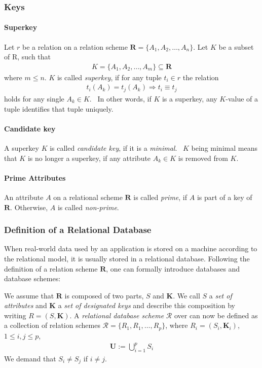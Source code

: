 \subsubsection{Keys}
\paragraph{Superkey}Let \( r \) be a relation on a relation scheme \( \boldsymbol{R} = \{ A_1, A_2, \dots, A_n \} \).
Let \( K \) be a subset of R, such that
\begin{align}
    K = \{ A_1, A_2, \dots, A_m \} \subseteq \boldsymbol{R}
\end{align}
where \( m \leq n \).
\( K \) is called \emph{superkey}, if for any tuple \( t_i \in r \) the relation
\begin{align*}
    t_i(A_k) = t_j(A_k) \Rightarrow t_i \equiv t_j
\end{align*}
holds for any single \( A_k \in K \).~\cite[p.~4]{MAI83}
In other words, if \( K \) is a superkey, any \( K \)-value of a tuple identifies that tuple uniquely.~\cite[p.~32]{SCH17}

\paragraph{Candidate key} A superkey \( K \) is called \emph{candidate key}, if it is a \emph{minimal}.~\cite[p.~32]{SCH17}
\( K \) being minimal means that \( K \) is no longer a superkey, if any attribute \( A_k \in K \) is removed from \( K \).

\paragraph{Prime Attributes} An attribute \( A \) on a relational scheme \( \boldsymbol{R} \) is called \emph{prime}, if \( A \) is part of a key of \( \boldsymbol{R} \).
Otherwise, \( A \) is called \emph{non-prime}.

\subsubsection{Definition of a Relational Database}
When real-world data used by an application is stored on a machine according to the relational model, it is usually stored in a relational database.
Following the definition of a relation scheme \( \boldsymbol{R} \), one can formally introduce databases and database schemes:

We assume that \( \boldsymbol{R}\) is composed of two parts, \(S\) and \(\boldsymbol{K}\). We call \(S\) a \emph{set of attributes} and \(\boldsymbol{K}\) a \emph{set of designated keys} and describe this composition by writing \(R = (S, \boldsymbol{K})\).
A \emph{relational database scheme} \( \mathcal{R} \) over  can now be defined as a collection of relation schemes \( \mathcal{R} = \{R_1, R_1, \dots, R_p\} \), where \(R_i = (S_i, \boldsymbol{K}_i)\), \(1 \leq i, j \leq p\),
\begin{align*}
    \boldsymbol{U} := \bigcup^{p}_{i=1} S_i
\end{align*}
We demand that \(S_i \neq S_j\) if \(i \neq j\).

